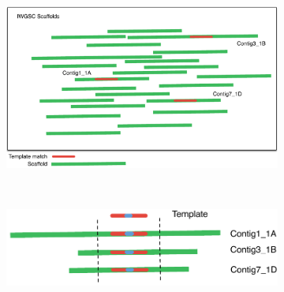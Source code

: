 \begin{figure}
    \begin{subfigure}[b]{0.4\textwidth}
        \caption{}
        \includegraphics[width=1\textwidth]{PolyMarker/Figures/aln/scaffoldsSearch.pdf}
        \label{fig:poly:globalSearch}
    \end{subfigure}
    ~ %
    \begin{subfigure}[b]{0.4\textwidth}
        \caption{}
        \raisebox{10mm} { \includegraphics[width=1\textwidth]{PolyMarker/Figures/aln/scaffoldsFoundAround.pdf} }
        \label{fig:poly:globalAround} 
    \end{subfigure}
    

\end{figure}
